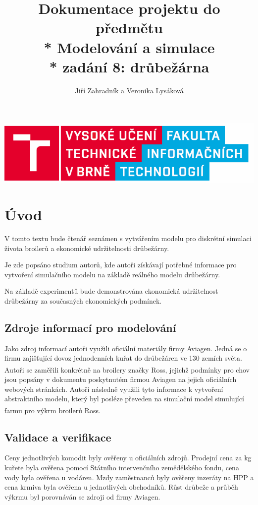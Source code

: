\documentclass[a4paper,10pt]{article}
\title{Dokumentace projektu do předmětu \\* Modelování a simulace\\* zadání 8: drůbežárna}
\author{Jiří Zahradník a Veronika Lysáková}
\date{}
\begin{document}
\maketitle
\includegraphics[scale=0.5]{fitnewb.png}
\pagebreak

\renewcommand{\contentsname}{Obsah}
\tableofcontents


\renewcommand{\figurename}{Obrázek}


\pagebreak

%
%

\section{Úvod}
V tomto textu bude čtenář seznámen s vytvářením modelu pro diskrétní simulaci\cite{diskretni_simulace}
života broilerů a ekonomické udržitelnosti drůbežárny.
\par 
Je zde popsáno studium autorů, kde autoři získávají potřebné informace
pro vytvoření simulačního modelu na základě reálného modelu drůbežárny.
\par
Na základě experimentů bude demonstrována ekonomická udržitelnost
drůbežárny za současných ekonomických podmínek.

\subsection{Zdroje informací pro modelování\cite{modelovani}}\label{zdroje}
Jako zdroj informací autoři využili oficiální materiály firmy Aviagen\cite{aviagen}.
Jedná se o firmu zajišťující dovoz jednodenních kuřat do drůbežáren ve 130 zemích světa.
Autoři se zaměřili konkrétně na broilery značky Ross\textsuperscript{\textregistered},
jejichž podmínky pro chov jsou popsány v dokumentu poskytnutém firmou Aviagen\cite{ross}
na jejich oficiálních webových stránkách. Autoři následně využili tyto informace k
vytvoření abstraktního modelu\cite{abstract_model}, který byl posléze převeden na simulační model\cite{simulation_model}
simulující farmu pro výkrm broilerů Ross\textsuperscript{\textregistered}. 

\subsection{Validace a verifikace}\label{validaceVerifikace}
Ceny jednotlivých komodit byly ověřeny u oficiálních zdrojů.
Prodejní cena za kg kuřete byla ověřena pomocí Státního intervenčního
zemědělského fondu\cite{szif}, cena vody byla ověřena u vodáren\cite{vodarny}.
Mzdy zaměstnanců byly ověřeny inzeráty na HPP a cena krmiva byla ověřena
u jednotlivých obchodníků. Růst drůbeže a průběh výkrmu byl porovnáván
se zdroji od firmy Aviagen\cite{ross}.
\end{document}
